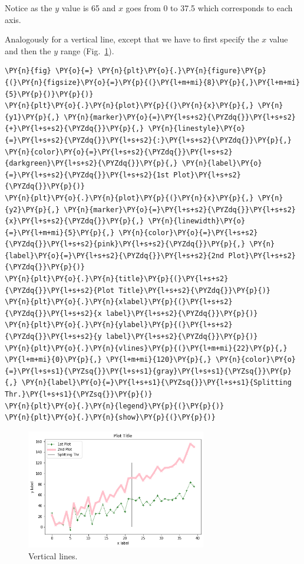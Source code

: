 Notice as the \(y\) value is 65 and \(x\) goes from 0 to 37.5 which
corresponds to each axis.

Analogously for a vertical line, except that we have to first specify
the \(x\) value and then the \(y\) range (Fig.~\ref{fig:lines2}).

\begin{tcolorbox}[breakable, size=fbox, boxrule=1pt, pad at break*=1mm,colback=cellbackground, colframe=cellborder]
\begin{Verbatim}[commandchars=\\\{\}]
\PY{n}{fig} \PY{o}{=} \PY{n}{plt}\PY{o}{.}\PY{n}{figure}\PY{p}{(}\PY{n}{figsize}\PY{o}{=}\PY{p}{(}\PY{l+m+mi}{8}\PY{p}{,}\PY{l+m+mi}{5}\PY{p}{)}\PY{p}{)}
\PY{n}{plt}\PY{o}{.}\PY{n}{plot}\PY{p}{(}\PY{n}{x}\PY{p}{,} \PY{n}{y1}\PY{p}{,} \PY{n}{marker}\PY{o}{=}\PY{l+s+s2}{\PYZdq{}}\PY{l+s+s2}{+}\PY{l+s+s2}{\PYZdq{}}\PY{p}{,} \PY{n}{linestyle}\PY{o}{=}\PY{l+s+s2}{\PYZdq{}}\PY{l+s+s2}{:}\PY{l+s+s2}{\PYZdq{}}\PY{p}{,} \PY{n}{color}\PY{o}{=}\PY{l+s+s2}{\PYZdq{}}\PY{l+s+s2}{darkgreen}\PY{l+s+s2}{\PYZdq{}}\PY{p}{,} \PY{n}{label}\PY{o}{=}\PY{l+s+s2}{\PYZdq{}}\PY{l+s+s2}{1st Plot}\PY{l+s+s2}{\PYZdq{}}\PY{p}{)}
\PY{n}{plt}\PY{o}{.}\PY{n}{plot}\PY{p}{(}\PY{n}{x}\PY{p}{,} \PY{n}{y2}\PY{p}{,} \PY{n}{marker}\PY{o}{=}\PY{l+s+s2}{\PYZdq{}}\PY{l+s+s2}{x}\PY{l+s+s2}{\PYZdq{}}\PY{p}{,} \PY{n}{linewidth}\PY{o}{=}\PY{l+m+mi}{5}\PY{p}{,} \PY{n}{color}\PY{o}{=}\PY{l+s+s2}{\PYZdq{}}\PY{l+s+s2}{pink}\PY{l+s+s2}{\PYZdq{}}\PY{p}{,} \PY{n}{label}\PY{o}{=}\PY{l+s+s2}{\PYZdq{}}\PY{l+s+s2}{2nd Plot}\PY{l+s+s2}{\PYZdq{}}\PY{p}{)}
\PY{n}{plt}\PY{o}{.}\PY{n}{title}\PY{p}{(}\PY{l+s+s2}{\PYZdq{}}\PY{l+s+s2}{Plot Title}\PY{l+s+s2}{\PYZdq{}}\PY{p}{)}
\PY{n}{plt}\PY{o}{.}\PY{n}{xlabel}\PY{p}{(}\PY{l+s+s2}{\PYZdq{}}\PY{l+s+s2}{x label}\PY{l+s+s2}{\PYZdq{}}\PY{p}{)}
\PY{n}{plt}\PY{o}{.}\PY{n}{ylabel}\PY{p}{(}\PY{l+s+s2}{\PYZdq{}}\PY{l+s+s2}{y label}\PY{l+s+s2}{\PYZdq{}}\PY{p}{)}
\PY{n}{plt}\PY{o}{.}\PY{n}{vlines}\PY{p}{(}\PY{l+m+mi}{22}\PY{p}{,} \PY{l+m+mi}{0}\PY{p}{,} \PY{l+m+mi}{120}\PY{p}{,} \PY{n}{color}\PY{o}{=}\PY{l+s+s1}{\PYZsq{}}\PY{l+s+s1}{gray}\PY{l+s+s1}{\PYZsq{}}\PY{p}{,} \PY{n}{label}\PY{o}{=}\PY{l+s+s1}{\PYZsq{}}\PY{l+s+s1}{Splitting Thr.}\PY{l+s+s1}{\PYZsq{}}\PY{p}{)}
\PY{n}{plt}\PY{o}{.}\PY{n}{legend}\PY{p}{(}\PY{p}{)}
\PY{n}{plt}\PY{o}{.}\PY{n}{show}\PY{p}{(}\PY{p}{)}
\end{Verbatim}
\end{tcolorbox}

\begin{figure}[htb]
	\centering
	\includegraphics[width=0.7\textwidth]{figures/lines2}
	\caption{Vertical lines.}
	\label{fig:lines2}
\end{figure}

